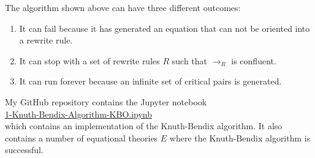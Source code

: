 \noindent
The algorithm shown above can have three different outcomes:
\begin{enumerate}
\item It can fail because it has generated an equation that can not be oriented into a rewrite rule.
\item It can stop with a set of rewrite rules $R$ such that $\rightarrow_R$ is confluent.
\item It can run forever because an infinite set of critical pairs is generated.
\end{enumerate} 
My GitHub repository contains the Jupyter notebook
\\[0.2cm]
\hspace*{1.3cm}
\href{https://github.com/karlstroetmann/Artificial-Intelligence/blob/master/Python/4%20Automatic%20Theorem%20Proving/1-Knuth-Bendix-Algorithm-KBO.ipynb}{1-Knuth-Bendix-Algorithm-KBO.ipynb}
\\[0.2cm]
which contains an implementation of the Knuth-Bendix algorithm.  It also contains a number of equational
theories $E$ where the Knuth-Bendix algorithm is successful.

